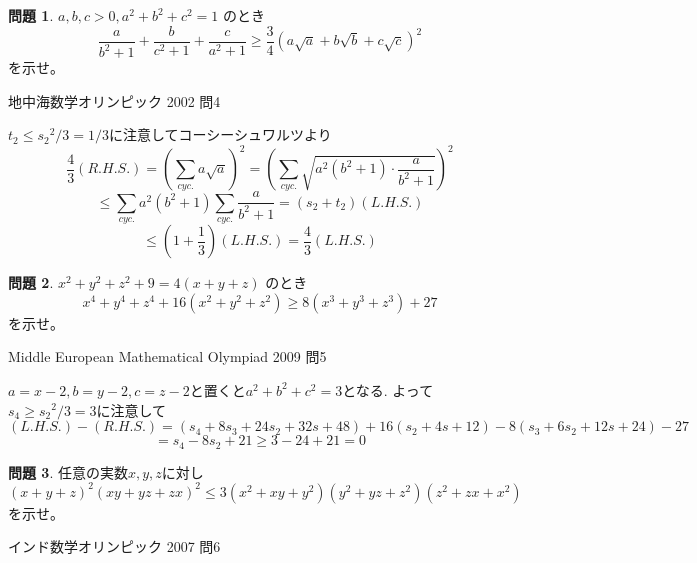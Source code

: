 \documentclass[uplatex, a5paper]{jsarticle}
\makeatletter
\theoremstyle{definition}
\newtheorem{prob}{問題}
\renewenvironment{proof}[1][\proofname]{
  \pushQED{\qed}%
  \normalfont \topsep6\p@\@plus6\p@\relax
  \trivlist
  \item[\hskip\labelsep
    #1\@addpunct{\textbf{.}}]\ignorespaces
}{%
  \popQED\endtrivlist\@endpefalse
}
\providecommand{\proofname}{証明}
\newcommand{\lhs }{ L.H.S. }
\newcommand{\rhs }{ R.H.S. }
\def\qed{\hfill $\Box$}
\makeatother
\begin{document}
\newpage

\begin{prob}
  \(a,b,c>0 , a^2+b^2+c^2 = 1\)
  のとき
  \[
  \frac{a}{b^2+1} + \frac{b}{c^2+1} + \frac{c}{a^2+1}
  \geq \frac{3}{4}\left( a\sqrt{a} + b\sqrt{b} + c\sqrt{c} \right) ^2
  \]
  を示せ。
  \begin{flushright}
    地中海数学オリンピック 2002 問4
  \end{flushright}
\end{prob}


\begin{proof}
  \(t_2 \leq {s_2}^2/3 =1/3\)に注意してコーシーシュワルツより
  \[
  \frac{4}{3}( \rhs ) = \left( \sum_{cyc.} a\sqrt{a} \right) ^2
  = \left( \sum_{cyc.} \sqrt{a^2(b^2+1) \cdot \frac{a}{b^2+1} } \right) ^2
  \]
  \[
  \leq \sum_{cyc.} a^2(b^2+1) \sum_{cyc.} \frac{a}{b^2+1} = (s_2+t_2)( \lhs )
  \]
  \[
  \leq \left( 1+\frac{1}{3} \right) ( \lhs ) = \frac{4}{3}(\lhs )
  \]
\end{proof}










\newpage

\begin{prob}
  \(x^2+y^2+z^2+9 = 4(x+y+z)\)
  のとき
  \[
  x^4+y^4+z^4+16(x^2+y^2+z^2) \geq 8(x^3+y^3+z^3)+27
  \]
  を示せ。
  \begin{flushright}
    Middle European Mathematical Olympiad 2009 問5
  \end{flushright}
\end{prob}


\begin{proof}
  \(a=x-2 , b=y-2,c=z-2\)と置くと\(a^2+b^2+c^2=3\)となる.
  よって\(s_4 \geq {s_2}^2/3 = 3\)に注意して
  \[
  (\lhs ) - (\rhs ) = ( s_4+8s_3 + 24s_2+32s+48)+16(s_2+4s+12) - 8(s_3+6s_2+12s+24)-27
  \]
  \[
  = s_4  -8s_2 +21 \geq 3-24+21=0
  \]
\end{proof}










\newpage

\begin{prob}
  任意の実数\(x,y,z\)に対し
  \[
  (x+y+z)^2(xy+yz+zx)^2 \leq 3(x^2+xy+y^2)(y^2+yz+z^2)(z^2+zx+x^2)
  \]
  を示せ。
  \begin{flushright}
    インド数学オリンピック 2007 問6
  \end{flushright}
\end{prob}
\end{document}
